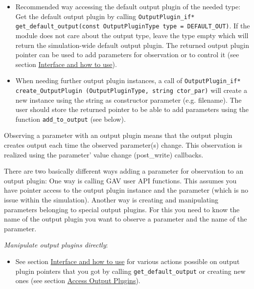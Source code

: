 \begin{itemize}
  \item Recommended way accessing the default output plugin of the needed type: \newline
     Get the default output plugin by calling
     \lstinline[language=TeX]|OutputPlugin_if* get_default_output(const OutputPluginType type = DEFAULT_OUT)|.
     If the module does not care about the output type, leave the type empty which will return the simulation-wide default output plugin. The returned output plugin pointer can be used to add parameters for observation or to control it (see section \hyperlink{InterfaceAndHowToUse}{Interface and how to use}).

  \item When needing further output plugin instances, a call of \lstinline|OutputPlugin_if* create_OutputPlugin (OutputPluginType, string ctor_par)| will create a new instance using the string as constructor parameter (e.g. filename). The user should store the returned pointer to be able to add parameters using the function \lstinline|add_to_output| (see below).
  
\end{itemize}


Observing a parameter with an output plugin means that the output plugin creates output each time the observed parameter(s) change. This observation is realized using the parameter' value change (post\_write) callbacks.

There are two basically different ways adding a parameter for observation to an output plugin: One way is calling GAV user API functions. This assumes you have pointer access to the output plugin instance and the parameter (which is no issue within the simulation). Another way is creating and manipulating parameters belonging to special output plugins. For this you need to know the name of the output plugin you want to observe a parameter and the name of the parameter.

{\em Manipulate output plugins directly}:
\begin{itemize}
	\item See section \hyperlink{InterfaceAndHowToUse}{Interface and how to use} for various actions possible on output plugin pointers that you got by calling \lstinline|get_default_output| or creating new ones (see section \hyperlink{AccessOutputPlugins}{Access Output Plugins}).
\end{itemize}

